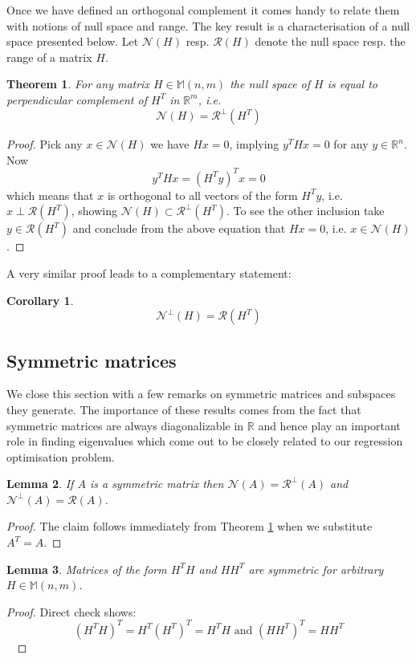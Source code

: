 \documentclass[a4paper]{article}
\theoremstyle{break}
\newtheorem{theorem}{Theorem}[section]
\newtheorem{corollary}{Corollary}[theorem]
\newtheorem{lemma}[theorem]{Lemma}
\newcommand{\R}{\mathbb{R}}
\newcommand{\Nu}{\mathcal{N}}
\newcommand{\Ra}{\mathcal{R}}
\newcommand{\Mat}[2]{\mathbb{M}(#1, #2)}
\begin{document}
Once we have defined an orthogonal complement it comes handy to relate them with notions of null space and range.
The key result is a characterisation of a null space presented below.
Let $\Nu(H)$ resp. $\Ra(H)$ denote the null space resp. the range of a matrix $H$.

\begin{theorem} \label{thm:charact_nullspace}
    For any matrix $H \in \Mat{n}{m}$ the null space of $H$ is equal to perpendicular complement of $H^T$ in $\R^m$, i.e.
    $$\Nu(H) = \Ra^\perp(H^T)$$
\end{theorem}

\begin{proof}
    Pick any $x \in \Nu(H)$ we have $H x = 0$, implying $ y^T H x = 0$ for any $y \in \R^n$. Now
    $$  y^T H x = (H^T y )^T x = 0$$
    which means that $x$ is orthogonal to all vectors of the form $ H^T y $, i.e. $ x \perp \Ra(H^T)$, showing $ \Nu(H) \subset \Ra^\perp(H^T)$. To see the other inclusion take $ y \in \Ra(H^T) $ and conclude from the above equation that $ H x = 0$, i.e. $ x \in \Nu(H)$.
\end{proof}
A very similar proof leads to a complementary statement:
\begin{corollary} \label{cor:charact_range}
    $$\Nu^\perp(H) = \Ra(H^T)$$
\end{corollary}

\subsection{Symmetric matrices}
We close this section with a few remarks on symmetric matrices and subspaces they generate. The importance of these results comes from the fact that symmetric matrices are always diagonalizable in $\R$ and hence play an important role in finding eigenvalues which come out to be closely related to our regression optimisation problem. 

\begin{lemma} \label{lem:charact_sym_nullspace}
    If $A$ is a symmetric matrix then $\Nu(A) = \Ra^\perp(A)$ and $\Nu^\perp(A) = \Ra(A)$.
\end{lemma}
\begin{proof}
    The claim follows immediately from Theorem \ref{thm:charact_nullspace} when we substitute $A^T = A$.
\end{proof}

\begin{lemma}
Matrices of the form $H^T H$ and $H H^T$ are symmetric for arbitrary $H \in \Mat{n}{m}$.
\end{lemma}
\begin{proof}
    Direct check shows:
    $$(H^T H)^T = H^T (H^T)^T = H^T H \text{ and } (H H^T)^T = H H^T$$~
\end{proof}
\end{document}
